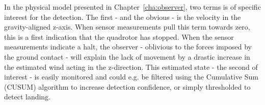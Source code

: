             In the physical model presented in Chapter~\ref{cha:observer},
            two terms is of specific interest for the detection.
            The first - and the obvious - is the velocity in the gravity-aligned z-axis.
            When sensor measurements pull this term towards zero,
            this is a first indication that the quadrotor has stopped.
            When the sensor measurements indicate a halt, the
            observer - oblivious to the forces imposed by the
            ground contact - will explain the lack of movement by a drastic increase in
            the estimated wind acting in the z-direction.
            This estimated state - the second of interest - is easily monitored
            and could e.g. be filtered using the Cumulative Sum (CUSUM) algorithm to
            increase detection confidence, or simply thresholded to detect landing.
